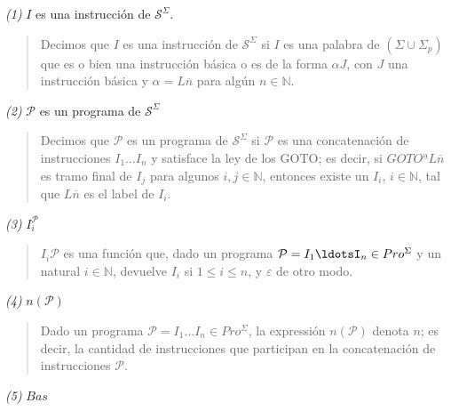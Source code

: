 \documentclass[a4paper, 12pt]{article}
\begin{document}
\pagebreak

\textit{(1)} $I$ es una instrucción de $\mathcal{S}^{\Sigma}$.


\small
\begin{quote}

    Decimos que $I$ es una instrucción de $\mathcal{S}^{\Sigma}$ si $I$ es una
    palabra de $(\Sigma \cup \Sigma_p)$ que es o bien una instrucción básica o
    es de la forma $\alpha J$, con $J$ una instrucción básica y $\alpha =
    L\overline{n}$ para algún $n \in \mathbb{N}$.

\end{quote}
\normalsize

\textit{(2)} $\mathcal{P}$ es un programa de $\mathcal{S}^{\Sigma}$


\small
\begin{quote}

    Decimos que $\mathcal{P}$ es un programa de $\mathcal{S}^{\Sigma}$ si
    $\mathcal{P}$ es una concatenación de instrucciones $I_1 \ldots I_n$ y
    satisface la ley de los GOTO; es decir, si $GOTO ª L\overline{n}$ es tramo
    final de $I_j$ para algunos $i, j \in \mathbb{N}$, entonces existe un $I_i$,
    $i \in \mathbb{N}$, tal que $L \overline{n}$ es el label de $I_i$.

\end{quote}
\normalsize

\textit{(3)} $I_i^{\mathcal{P}}$


\small
\begin{quote}

$I_i \mathcal{P}$ es una función que, dado un programa $\mathcal{P} =
I_1\ldotsI_n \in
Pro^{\Sigma}$ y un natural $i \in \mathbb{N}$, devuelve $I_i$ si $1 \leq i \leq
n$, y $\varepsilon $ de otro modo.

\end{quote}
\normalsize

\textit{(4)} $n(\mathcal{P})$


\small
\begin{quote}

Dado un programa $\mathcal{P} = I_1 \ldots I_n \in Pro^{\Sigma}$, la expressión
$n(\mathcal{P})$ denota $n$; es decir, la cantidad de instrucciones que
participan en la concatenación de instrucciones $\mathcal{P}$.


\end{quote}
\normalsize
\textit{(5)} $Bas$
\end{document}
